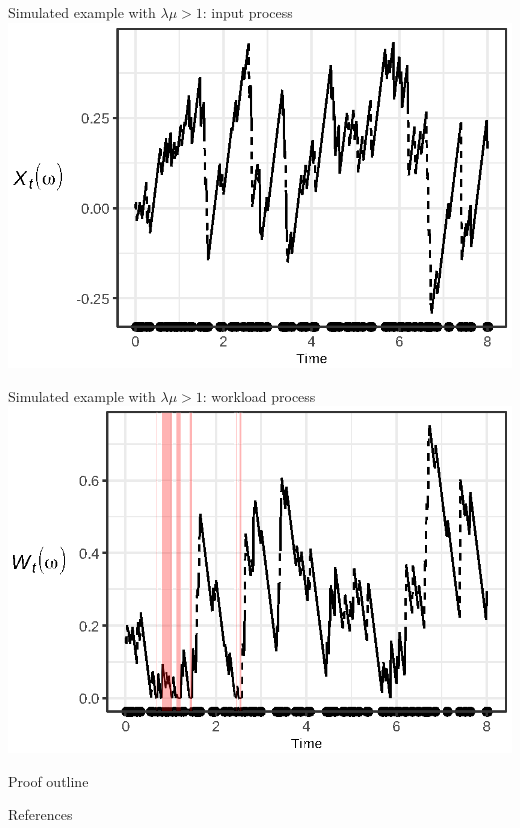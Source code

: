 \documentclass{beamer}
\begin{document}
\begin{frame}[plain]{Simulated example with $\lambda \mu > 1$: input process}
  \includegraphics{input_ge_1_prsnt}
\end{frame}

\begin{frame}{Simulated example with $\lambda \mu > 1$: workload process}
  \includegraphics{workload_ge_1_prsnt}
\end{frame}

\begin{frame}{Proof outline}
  
\end{frame}

\begin{frame}[allowframebreaks]{References}
  \tiny
  \nocite{*}
  \printbibliography
\end{frame}
\end{document}
